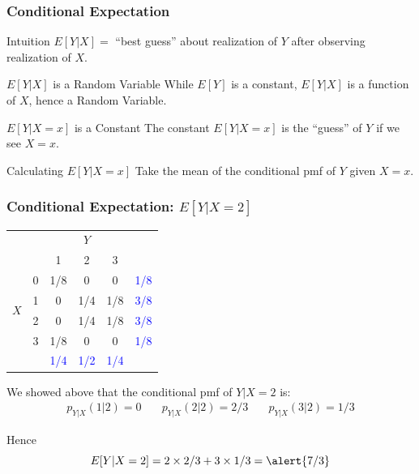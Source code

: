 \documentclass[handout]{beamer}
\begin{document}
\begin{frame}
\frametitle{Conditional Expectation}
\begin{block}{Intuition}
	$E[Y|X] = $ ``best guess'' about realization of $Y$ after observing realization of $X$. 
\end{block}

\begin{block}{$E[Y|X]$ is a Random Variable}
While $E[Y]$ is a constant, $E[Y|X]$ is a function of $X$, hence a \alert{Random Variable}.
\end{block}

\begin{block}{$E[Y|X=x]$ is a Constant}
  The constant $E[Y|X=x]$ is the ``guess'' of $Y$ if we see $X=x$.
\end{block}

\begin{block}{Calculating $E[Y|X=x]$}
Take the mean of the conditional pmf of $Y$ given $X=x$.
\end{block}

\end{frame}
\begin{frame}
	\frametitle{Conditional Expectation: $E[Y|X=2]$}

\footnotesize
\begin{table}
\begin{tabular}{|cc|ccc|c|}
\hline
&&\multicolumn{3}{c|}{$Y$}&\\
&&1 & 2&3&\\
\hline
\multirow{4}{*}{$X$}
&0& \multicolumn{1}{|c}{\alert{1/8}} & \alert{0}& \alert{0}&\textcolor{blue}{1/8}\\
&1& \multicolumn{1}{|c}{\alert{0}} & \alert{1/4}&\alert{1/8}&\textcolor{blue}{3/8}\\
&2& \multicolumn{1}{|c}{\alert{0}} & \alert{1/4}&\alert{1/8}&\textcolor{blue}{3/8}\\
&3& \multicolumn{1}{|c}{\alert{1/8}} & \alert{0}&\alert{0}&\textcolor{blue}{1/8}\\
\hline
&&\textcolor{blue}{1/4}&\textcolor{blue}{1/2}&\textcolor{blue}{1/4}&\\
\hline
\end{tabular}
\end{table}

We showed above that the conditional pmf of $Y|X=2$ is:
	$$\boxed{\begin{array}{ccc}p_{Y|X}(1|2) =0 \quad&p_{Y|X}(2|2) =2/3 \quad&p_{Y|X}(3|2) =1/3\end{array}}$$
	
	
Hence
	$$E[Y|X=2] = 2 \times 2/3 + 3 \times 1/3 =  \alert{7/3}$$

\end{frame}
\end{document}
